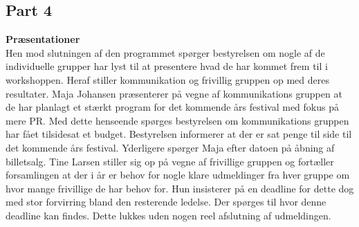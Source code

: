 \subsection{Part 4}
\label{ws4}
\noindent \textbf{Præsentationer} \\
Hen mod slutningen af den programmet spørger bestyrelsen om nogle af de individuelle grupper har lyst til at presentere hvad de har kommet frem til i workshoppen. Heraf stiller kommunikation og frivillig gruppen op med deres resultater. 
Maja Johansen præsenterer på vegne af kommunikations gruppen at de har planlagt et stærkt program for det kommende års festival med fokus på mere PR. Med dette henseende spørges bestyrelsen om kommunikations gruppen har fået tilsidesat et budget. Bestyrelsen informerer at der er sat penge til side til det kommende års festival. Yderligere spørger Maja efter datoen på åbning af billetsalg.
Tine Larsen stiller sig op på vegne af frivillige gruppen og fortæller forsamlingen at der i år er behov for nogle klare udmeldinger fra hver gruppe om hvor mange frivillige de har behov for. Hun insisterer på en deadline for dette dog med stor forvirring bland den resterende ledelse. Der spørges til hvor denne deadline kan findes. Dette lukkes uden nogen reel afslutning af udmeldingen.